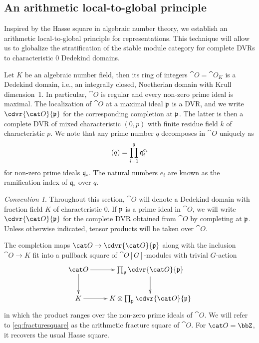 \documentclass{amsart}%
\numberwithin{equation}{section}%
\theoremstyle{remark}
\newtheorem{Conv}[equation]{Convention}
\begin{document}
\subsection{An arithmetic local-to-global principle}\label{ssec:arithlgt}

Inspired by the Hasse square in algebraic number theory, we establish an arithmetic local-to-global principle for representations. This technique will allow us to globalize the stratification of the stable module category for complete DVRs to characteristic $0$ Dedekind domains. 

Let $K$ be an algebraic number field, then its ring of integers $\cat O = \cat O_K$ is a Dedekind domain, i.e., an integrally closed, Noetherian domain with Krull dimension~1. In particular, $\cat O$ is regular and every non-zero prime ideal is maximal. The localization of $\cat O$ at a maximal ideal $\frak p$ is a DVR, and we write $\cdvr{\cat O}{\frak p}$ for the corresponding completion at $\frak p$. The latter is then a complete DVR of mixed characteristic $(0,p)$ with finite residue field $k$ of characteristic $p$. We note that any prime number $q$ decomposes in $\cat O$ uniquely as
\begin{equation}\label{eq:primedecomposition}
(q) = \prod_{i=1}^g\frak q_i^{e_i}
\end{equation}
for non-zero prime ideals $\frak q_i$. The natural numbers $e_i$ are known as the ramification index of $\frak q_i$ over $q$.

\begin{Conv}\label{conv:o}
Throughout this section, $\cat O$ will denote a Dedekind domain with fraction field $K$ of characteristic $0$. If $\frak p$ is a prime ideal in $\cat O$, we will write $\cdvr{\cat O}{\frak p}$ for the complete DVR obtained from $\cat O$ by completing at $\frak p$. Unless otherwise indicated, tensor products will be taken over $\cat O$.
\end{Conv}

The completion maps $\cat O \to \cdvr{\cat O}{\frak p}$ along with the inclusion $\cat O \to K$ fit into a pullback square of $\cat O[G]$-modules with trivial $G$-action
\begin{equation}\label{eq:fracturesquare}
    \vcenter{
    \xymatrix{\cat O \ar[r] \ar[d] & \prod_{\frak p}\cdvr{\cat O}{\frak p} \ar[d] \\
    K \ar[r] & K\otimes\prod_{\frak p}\cdvr{\cat O}{\frak p}}
    }
\end{equation}
in which the product ranges over the non-zero prime ideals of $\cat O$. We will refer to \eqref{eq:fracturesquare} as the arithmetic fracture square of $\cat O$. For $\cat O = \bbZ$, it recovers the usual Hasse square. 
\end{document}

